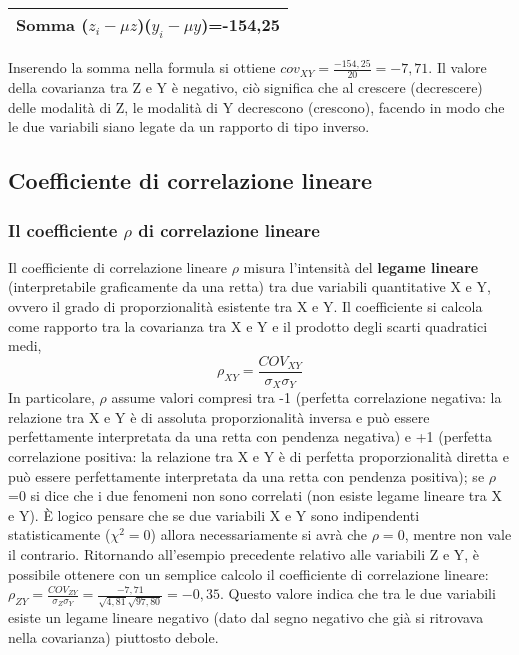 \begin{esempio}
\vspace{6pt}
\begin{tabular}{|c|}
\hline
Somma ($z_i-\mu z$)($y_i-\mu y$)=-154,25\\
\hline
\end{tabular}

\vspace{6pt}
Inserendo la somma nella formula si ottiene 
$cov_{XY}=\frac{-154,25}{20}=-7,71$.
Il valore della covarianza tra Z e Y è negativo, ciò significa che al 
crescere (decrescere) delle modalità di Z, le modalità di Y decrescono 
(crescono), facendo in modo che le due variabili siano legate da un 
rapporto di tipo inverso.
\end{esempio}

\subsection{Coefficiente di correlazione lineare}

\subsubsection{Il coefficiente $\rho$ di correlazione lineare}

Il coefficiente di correlazione lineare $\rho$ misura l'intensità del 
\textbf{legame lineare} (interpretabile graficamente da una retta) tra due 
variabili quantitative X e Y, ovvero il grado di proporzionalità esistente 
tra X e Y.
Il coefficiente si calcola come rapporto tra la covarianza tra X e Y e il 
prodotto degli scarti quadratici medi, 
$$\rho_{XY}=\frac{COV_{XY}}{\sigma_X\sigma_Y}$$
 In particolare, $\rho$ assume valori compresi tra -1 (perfetta 
correlazione negativa: la relazione tra X e Y è di assoluta proporzionalità 
inversa e può essere perfettamente interpretata da una retta con pendenza 
negativa) e +1 (perfetta correlazione positiva: la relazione tra X e Y è di 
perfetta proporzionalità diretta e può essere perfettamente interpretata da 
una retta con pendenza positiva); se $\rho$=0 si dice che i due fenomeni non 
sono correlati (non esiste legame lineare tra X e Y). 
È logico pensare che se 
due variabili X e Y sono indipendenti statisticamente ($\chi^2=0$) allora 
necessariamente si avrà che $\rho=0$, mentre non vale il contrario.
 Ritornando all'esempio precedente relativo alle variabili Z e Y, è 
possibile ottenere con un semplice calcolo il coefficiente di correlazione 
lineare: 
$\rho_{ZY}=\frac{COV_{ZY}}{\sigma_Z\sigma_Y}=\frac{-7,71}{\sqrt{4,81}\sqrt{
97,80}}=-0,35$.
 Questo valore indica che tra le due variabili esiste un legame lineare 
negativo (dato dal segno negativo che già si ritrovava nella covarianza) 
piuttosto debole.
 
